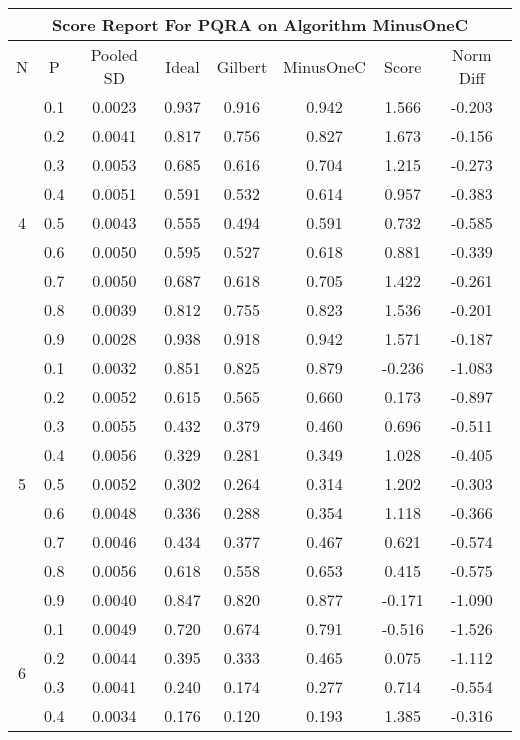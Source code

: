 \documentclass[11pt,a4paper]{report}
\begin{document}
\begin{longtable}{ | c | c || c | c | c | c | c | c | }
\hline
\multicolumn{8}{|c|}{ Score Report For PQRA on Algorithm MinusOneC} \\
\hline
N & P & Pooled SD &  Ideal &  Gilbert & MinusOneC  & Score & Norm Diff \\
 \hline
 \hline
 \endhead
\multirow{9}{*}{4} & 0.1 & 0.0023 & 0.937 & 0.916 & 0.942 & 1.566 & -0.203 \\
 & 0.2 & 0.0041 & 0.817 & 0.756 & 0.827 & 1.673 & -0.156 \\
 & 0.3 & 0.0053 & 0.685 & 0.616 & 0.704 & 1.215 & -0.273 \\
 & 0.4 & 0.0051 & 0.591 & 0.532 & 0.614 & 0.957 & -0.383 \\
 & 0.5 & 0.0043 & 0.555 & 0.494 & 0.591 & 0.732 & -0.585 \\
 & 0.6 & 0.0050 & 0.595 & 0.527 & 0.618 & 0.881 & -0.339 \\
 & 0.7 & 0.0050 & 0.687 & 0.618 & 0.705 & 1.422 & -0.261 \\
 & 0.8 & 0.0039 & 0.812 & 0.755 & 0.823 & 1.536 & -0.201 \\
 & 0.9 & 0.0028 & 0.938 & 0.918 & 0.942 & 1.571 & -0.187 \\
 \hline
\multirow{9}{*}{5} & 0.1 & 0.0032 & 0.851 & 0.825 & 0.879 & -0.236 & -1.083 \\
 & 0.2 & 0.0052 & 0.615 & 0.565 & 0.660 & 0.173 & -0.897 \\
 & 0.3 & 0.0055 & 0.432 & 0.379 & 0.460 & 0.696 & -0.511 \\
 & 0.4 & 0.0056 & 0.329 & 0.281 & 0.349 & 1.028 & -0.405 \\
 & 0.5 & 0.0052 & 0.302 & 0.264 & 0.314 & 1.202 & -0.303 \\
 & 0.6 & 0.0048 & 0.336 & 0.288 & 0.354 & 1.118 & -0.366 \\
 & 0.7 & 0.0046 & 0.434 & 0.377 & 0.467 & 0.621 & -0.574 \\
 & 0.8 & 0.0056 & 0.618 & 0.558 & 0.653 & 0.415 & -0.575 \\
 & 0.9 & 0.0040 & 0.847 & 0.820 & 0.877 & -0.171 & -1.090 \\
 \hline
\multirow{9}{*}{6} & 0.1 & 0.0049 & 0.720 & 0.674 & 0.791 & -0.516 & -1.526 \\
 & 0.2 & 0.0044 & 0.395 & 0.333 & 0.465 & 0.075 & -1.112 \\
 & 0.3 & 0.0041 & 0.240 & 0.174 & 0.277 & 0.714 & -0.554 \\
 & 0.4 & 0.0034 & 0.176 & 0.120 & 0.193 & 1.385 & -0.316 \\

\end{longtable}
\end{document}
